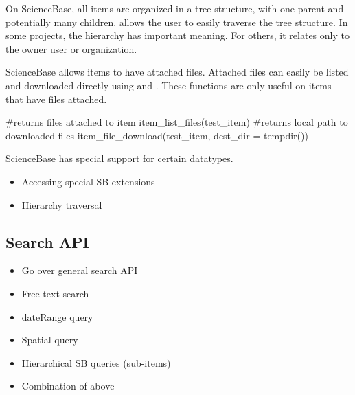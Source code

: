 On ScienceBase, all items are organized in a tree structure, with one 
parent and potentially many children.  allows the user to 
easily traverse the tree structure. In some projects, the hierarchy has 
important meaning. For others, it relates only to the owner user or
organization.


ScienceBase allows items to have attached files. Attached files can easily be 
listed and downloaded directly using  and 
. These functions are only useful on items 
that have files attached.

\begin{example}
#returns files attached to item
item_list_files(test_item)
#returns local path to downloaded files
item_file_download(test_item, dest_dir = tempdir())
\end{example}

ScienceBase has special support for certain datatypes. 

\begin{example}
	
\end{example}

\begin{itemize}
	\item{Accessing special SB extensions}
	\item{Hierarchy traversal}
\end{itemize}


\subsection{Search API}
\begin{itemize}
	\item{Go over general search API}
	\item{Free text search}
	\item{dateRange query}
	\item{Spatial query}
	\item{Hierarchical SB queries (sub-items)}
	\item{Combination of above}
\end{itemize}

